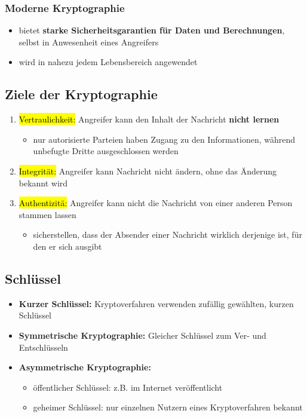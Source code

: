 \documentclass[a4paper, 10pt]{article}
\begin{document}
\subsubsection{Moderne Kryptographie}
\begin{itemize}
    \item  bietet \textbf{starke Sicherheitsgarantien für Daten und Berechnungen}, selbst in Anwesenheit eines Angreifers
    \item wird in nahezu jedem Lebensbereich angewendet
\end{itemize}

\subsection{Ziele der Kryptographie}
\begin{enumerate}
    \item \hl{Vertraulichkeit:} Angreifer kann den Inhalt der Nachricht \textbf{nicht lernen}
    \begin{itemize}
    
        \item nur autorisierte Parteien haben Zugang zu den Informationen, während unbefugte Dritte ausgeschlossen werden 
    \end{itemize}

    \item \hl{Integrität:} Angreifer kann Nachricht nicht ändern, ohne das Änderung bekannt wird
    
    \item \hl{Authentizitä:} Angreifer kann nicht die Nachricht von einer anderen Person stammen lassen
    \begin{itemize}
        \item sicherstellen, dass der Absender einer Nachricht wirklich derjenige ist, für den er sich ausgibt
    \end{itemize}
\end{enumerate}

\subsection{Schlüssel}
\begin{itemize}
    \item \textbf{Kurzer Schlüssel:} Kryptoverfahren verwenden zufällig gewählten, kurzen Schlüssel
    \item \textbf{Symmetrische Kryptographie:} Gleicher Schlüssel zum Ver- und Entschlüsseln
    \item \textbf{Asymmetrische Kryptographie:} 
    \begin{itemize}
        \item öffentlicher Schlüssel: z.B. im Internet veröffentlicht
        \item geheimer Schlüssel: nur einzelnen Nutzern eines Kryptoverfahren bekannt
    \end{itemize}
\end{itemize}
\end{document}
